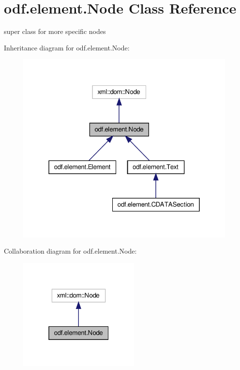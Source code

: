 \hypertarget{classodf_1_1element_1_1Node}{\section{odf.\+element.\+Node Class Reference}
\label{classodf_1_1element_1_1Node}
}


super class for more specific nodes  




Inheritance diagram for odf.\+element.\+Node\+:
\nopagebreak
\begin{figure}[H]
\begin{center}
\leavevmode
\includegraphics[width=313pt]{classodf_1_1element_1_1Node__inherit__graph}
\end{center}
\end{figure}


Collaboration diagram for odf.\+element.\+Node\+:
\nopagebreak
\begin{figure}[H]
\begin{center}
\leavevmode
\includegraphics[width=172pt]{classodf_1_1element_1_1Node__coll__graph}
\end{center}
\end{figure}
